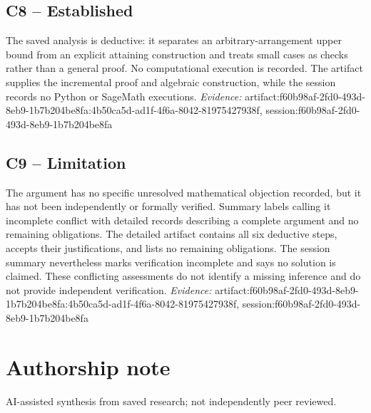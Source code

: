 \documentclass[11pt]{article}
\begin{document}
\subsection{C8 -- Established}
The saved analysis is deductive: it separates an arbitrary-arrangement upper bound from an explicit attaining construction and treats small cases as checks rather than a general proof. No computational execution is recorded.
The artifact supplies the incremental proof and algebraic construction, while the session records no Python or SageMath executions.
\textit{Evidence: }artifact:f60b98af-2fd0-493d-8eb9-1b7b204be8fa:4b50ca5d-ad1f-4f6a-8042-81975427938f, session:f60b98af-2fd0-493d-8eb9-1b7b204be8fa
\subsection{C9 -- Limitation}
The argument has no specific unresolved mathematical objection recorded, but it has not been independently or formally verified. Summary labels calling it incomplete conflict with detailed records describing a complete argument and no remaining obligations.
The detailed artifact contains all six deductive steps, accepts their justifications, and lists no remaining obligations. The session summary nevertheless marks verification incomplete and says no solution is claimed. These conflicting assessments do not identify a missing inference and do not provide independent verification.
\textit{Evidence: }artifact:f60b98af-2fd0-493d-8eb9-1b7b204be8fa:4b50ca5d-ad1f-4f6a-8042-81975427938f, session:f60b98af-2fd0-493d-8eb9-1b7b204be8fa
\section*{Authorship note}
AI-assisted synthesis from saved research; not independently peer reviewed.
\end{document}
